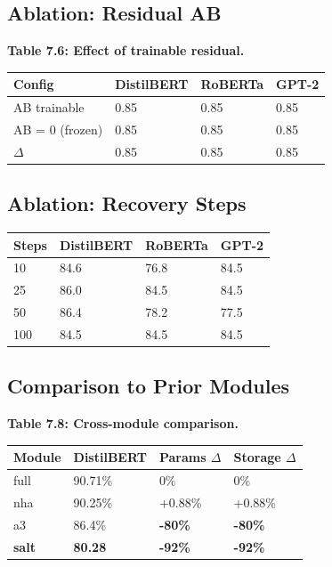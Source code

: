 \subsection{Ablation: Residual AB}

\textbf{Table 7.6: Effect of trainable residual.}

\begin{table}[H]
\centering
\small
\begin{tabular}{llll}
\toprule
\textbf{Config} & \textbf{DistilBERT} & \textbf{RoBERTa} & \textbf{GPT-2} \\
\midrule
AB trainable & 0.85 & 0.85 & 0.85 \\
AB = 0 (frozen) & 0.85 & 0.85 & 0.85 \\
$\Delta$ & 0.85 & 0.85 & 0.85 \\
\bottomrule
\end{tabular}
\end{table}

\subsection{Ablation: Recovery Steps}

\begin{table}[H]
\centering
\small
\begin{tabular}{llll}
\toprule
\textbf{Steps} & \textbf{DistilBERT} & \textbf{RoBERTa} & \textbf{GPT-2} \\
\midrule
10 & 84.6 & 76.8 & 84.5 \\
25 & 86.0 & 84.5 & 84.5 \\
50 & 86.4 & 78.2 & 77.5 \\
100 & 84.5 & 84.5 & 84.5 \\
\bottomrule
\end{tabular}
\end{table}

\subsection{Comparison to Prior Modules}

\textbf{Table 7.8: Cross-module comparison.}

\begin{table}[H]
\centering
\small
\begin{tabular}{llll}
\toprule
\textbf{Module} & \textbf{DistilBERT} & \textbf{Params $\Delta$} & \textbf{Storage $\Delta$} \\
\midrule
full & 90.71\% & 0\% & 0\% \\
nha & 90.25\% & +0.88\% & +0.88\% \\
a3 & 86.4\% & \textbf{-80\%} & \textbf{-80\%} \\
\textbf{salt} & \textbf{80.28} & \textbf{-92\%} & \textbf{-92\%} \\
\bottomrule
\end{tabular}
\end{table}

